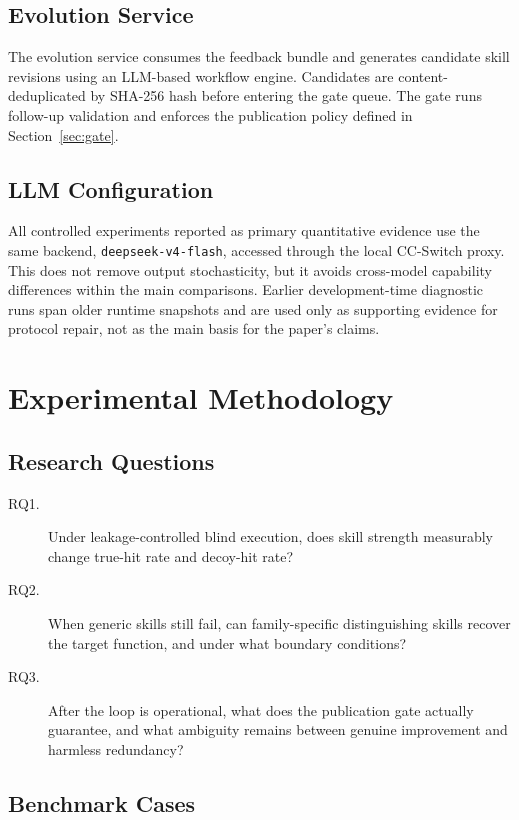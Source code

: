 ﻿\documentclass[preprint,12pt]{elsarticle}
\begin{document}
\subsection{Evolution Service}

The evolution service consumes the feedback bundle and generates candidate
skill revisions using an LLM-based workflow engine.  Candidates are
content-deduplicated by SHA-256 hash before entering the gate queue.  The
gate runs follow-up validation and enforces the publication policy defined
in Section~\ref{sec:gate}.

\subsection{LLM Configuration}

All controlled experiments reported as primary quantitative evidence use the
same backend, \texttt{deepseek-v4-flash}, accessed through the local
CC-Switch proxy.  This does not remove output stochasticity, but it avoids
cross-model capability differences within the main comparisons.  Earlier
development-time diagnostic runs span older runtime snapshots and are used
only as supporting evidence for protocol repair, not as the main basis for
the paper's claims.

\section{Experimental Methodology}
\label{sec:evaluation}

\subsection{Research Questions}

\begin{description}
    \item[RQ1.] Under leakage-controlled blind execution, does skill
    strength measurably change true-hit rate and decoy-hit rate?
    \item[RQ2.] When generic skills still fail, can family-specific
    distinguishing skills recover the target function, and under what
    boundary conditions?
    \item[RQ3.] After the loop is operational, what does the publication
    gate actually guarantee, and what ambiguity remains between genuine
    improvement and harmless redundancy?
\end{description}

\subsection{Benchmark Cases}
\end{document}
